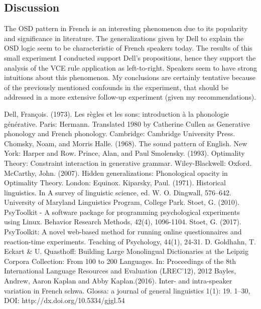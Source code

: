 \documentclass{article}
\begin{document}
\subsection{Discussion}
The OSD pattern in French is an interesting phenomenon due to its popularity and significance in literature. The generalizations given by Dell to explain the OSD logic seem to be characteristic of French speakers today. The results of this small experiment I conducted support Dell's propositions, hence they support the analysis of the VCE rule application as left-to-right. Speakers seem to have strong intuitions about this phenomenon.
My conclusions are certainly tentative because of the previously mentioned confounds in the experiment,  that should be addressed in a more extensive follow-up experiment (given my recommendations).

\clearpage
\fancyhead{} %

\begin{thebibliography}{} %
Dell, François. (1973). Les règles et les sons: introduction à la phonologie générative. Paris: Hermann. Translated 1980 by Catherine Cullen as Generative phonology and French phonology. Cambridge: Cambridge University Press.
Chomsky, Noam, and Morris Halle. (1968). The sound pattern of English. New York: Harper and Row.
Prince, Alan, and Paul Smolensky.  (1993). Optimality Theory: Constraint interaction in generative grammar. Wiley-Blackwell: Oxford.
McCarthy, John. (2007). Hidden generalizations: Phonological opacity in Optimality Theory. London: Equinox.
Kiparsky, Paul. (1971). Historical linguistics. In A survey of linguistic science, ed. W. O. Dingwall, 576–642. University of Maryland Linguistics Program, College Park.
Stoet, G. (2010). PsyToolkit - A software package for programming psychological experiments using Linux. 	Behavior Research Methods, 42(4), 1096-1104.  
Stoet, G. (2017). PsyToolkit: A novel web-based method for running online questionnaires and reaction-time experiments. Teaching of Psychology, 44(1), 24-31.
D. Goldhahn, T. Eckart \& U. Quasthoff: Building Large Monolingual Dictionaries at the Leipzig Corpora Collection: From 100 to 200 Languages.
In: Proceedings of the 8th International Language Resources and Evaluation (LREC'12), 2012
Bayles, Andrew, Aaron Kaplan and Abby Kaplan.(2016). Inter- and intra-speaker variation in French schwa. Glossa: a journal of general linguistics 1(1): 19. 1–30, DOI: http://dx.doi.org/10.5334/gjgl.54
\end{thebibliography}
\end{document}
